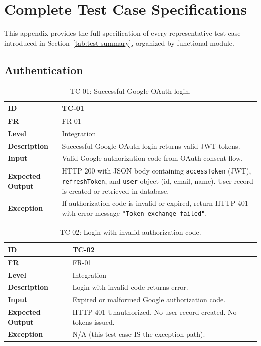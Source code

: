 \documentclass[a4paper]{article}
\begin{document}
\newpage
\section{Complete Test Case Specifications}
\label{appendix:test-cases}

This appendix provides the full specification of every
representative test case introduced in
Section~\ref{tab:test-summary}, organized by functional
module.

\subsection{Authentication}

\begin{table}[H]
\centering
\caption{TC-01: Successful Google OAuth login.}
\begin{tabular}{|p{3cm}|p{10.5cm}|}
\hline
\textbf{ID} & TC-01 \\
\hline
\textbf{FR} & FR-01 \\
\hline
\textbf{Level} & Integration \\
\hline
\textbf{Description} & Successful Google OAuth login returns
valid JWT tokens. \\
\hline
\textbf{Input} & Valid Google authorization code from OAuth
consent flow. \\
\hline
\textbf{Expected Output} & HTTP 200 with JSON body containing
\texttt{accessToken} (JWT), \texttt{refreshToken}, and
\texttt{user} object (id, email, name). User record is
created or retrieved in database. \\
\hline
\textbf{Exception} & If authorization code is invalid or
expired, return HTTP 401 with error message
\texttt{"Token exchange failed"}. \\
\hline
\end{tabular}
\small
\end{table}

\begin{table}[H]
\centering
\caption{TC-02: Login with invalid authorization code.}
\begin{tabular}{|p{3cm}|p{10.5cm}|}
\hline
\textbf{ID} & TC-02 \\
\hline
\textbf{FR} & FR-01 \\
\hline
\textbf{Level} & Integration \\
\hline
\textbf{Description} & Login with invalid code returns error. \\
\hline
\textbf{Input} & Expired or malformed Google authorization code. \\
\hline
\textbf{Expected Output} & HTTP 401 Unauthorized. No user record created. No tokens issued. \\
\hline
\textbf{Exception} & N/A (this test case IS the exception path). \\
\hline
\end{tabular}
\small
\end{table}
\end{document}
